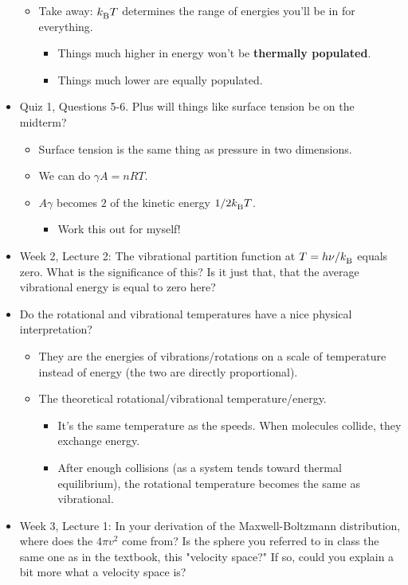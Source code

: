 \documentclass[../notes.tex]{subfiles}
\begin{document}
\begin{itemize}
\begin{itemize}
        \item Take away: ${k_\text{B}^{}} T$ determines the range of energies you'll be in for everything.
        \begin{itemize}
            \item Things much higher in energy won't be \textbf{thermally populated}.
            \item Things much lower are equally populated.
        \end{itemize}
    \end{itemize}
    \item Quiz 1, Questions 5-6. Plus will things like surface tension be on the midterm?
    \begin{itemize}
        \item Surface tension is the same thing as pressure in two dimensions.
        \item We can do $\gamma A=nRT$.
        \item $A\gamma$ becomes $2$ of the kinetic energy $1/2{k_\text{B}^{}} T$.
        \begin{itemize}
            \item Work this out for myself!
        \end{itemize}
    \end{itemize}
    \item Week 2, Lecture 2: The vibrational partition function at $T=h\nu/{k_\text{B}^{}}$ equals zero. What is the significance of this? Is it just that, that the average vibrational energy is equal to zero here?
    \item Do the rotational and vibrational temperatures have a nice physical interpretation?
    \begin{itemize}
        \item They are the energies of vibrations/rotations on a scale of temperature instead of energy (the two are directly proportional).
        \item The theoretical rotational/vibrational temperature/energy.
        \begin{itemize}
            \item It's the same temperature as the speeds. When molecules collide, they exchange energy.
            \item After enough collisions (as a system tends toward thermal equilibrium), the rotational temperature becomes the same as vibrational.
        \end{itemize}
    \end{itemize}
    \item Week 3, Lecture 1: In your derivation of the Maxwell-Boltzmann distribution, where does the $4\pi v^2$ come from? Is the sphere you referred to in class the same one as in the textbook, this "velocity space?" If so, could you explain a bit more what a velocity space is?

\end{itemize}
\end{document}
